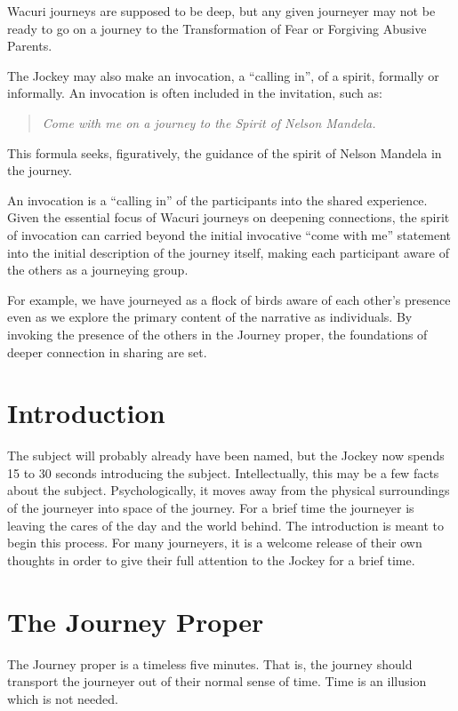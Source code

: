 \documentclass[12pt]{book}
\begin{document}
Wacuri journeys are supposed to be deep, but any given journeyer may not be ready to go on a journey to the Transformation of Fear
or Forgiving Abusive Parents.
					
The Jockey may also make an invocation, a “calling in”, of a spirit, formally or informally. An invocation is often included in the invitation, such as:

\begin{quote}{\em 
    Come with me on a journey to the Spirit of Nelson Mandela.}
    \end{quote}
					
This formula seeks, figuratively, the guidance of the spirit of Nelson Mandela in the journey.

An invocation is a “calling in” of the participants into the shared experience. Given the essential focus of Wacuri journeys on deepening connections, the spirit of invocation can carried beyond the initial invocative “come with me” statement into the initial description of the journey itself, making each participant aware of the others as a journeying group. 

For example, we have journeyed as a flock of birds aware of each other’s presence even as we explore the primary content of the narrative as individuals. By invoking the presence of the others in the Journey proper, the foundations of deeper connection in sharing are set.


\section{Introduction}
					
The subject will probably already have been named, but the Jockey now spends 15 to 30 seconds introducing the subject. Intellectually, this may be a few facts about the subject. Psychologically, it moves away from the physical surroundings of the journeyer into space of the journey. For a brief time the journeyer is leaving the cares of the day and the world behind. The introduction is meant to begin this process. For many journeyers, it is a welcome release of their own thoughts in order to give their full attention to the Jockey for a brief time.
					
\section{The Journey Proper}
					
The Journey proper is a timeless five minutes. That is, the journey should transport the journeyer out of their normal sense of time. Time is an illusion which is not needed.
					
\end{document}
